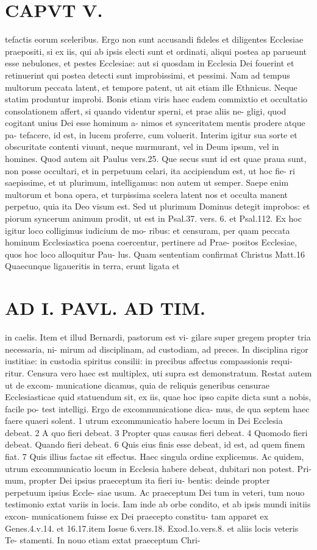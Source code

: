 \documentclass{article}
\begin{document}
\begin{pages}
\section*{CAPVT  V. }
\marginpar{[ p.383 ]}tefactis eorum sceleribus. Ergo non sunt accusandi fideles et diligentes Ecclesiae praepositi, si ex iis, qui ab ipsis electi sunt et ordinati, aliqui postea ap parueunt esse nebulones, et pestes Ecclesiae: aut si quosdam in Ecclesia Dei fouerint et retinuerint qui postea detecti sunt improbissimi, et pessimi. Nam ad tempus multorum peccata latent, et tempore patent, ut ait etiam ille Ethnicus. Neque statim produntur improbi. Bonis etiam viris haec eadem commixtio et occultatio consolationem affert, si quando videntur sperni, et prae aliis ne- gligi, quod cogitant unius Dei esse hominum a- nimos et synceritatem mentis prodere atque pa- tefacere, id est, in lucem proferre, cum voluerit. Interim igitur sua sorte et obscuritate contenti viuunt, neque murmurant, vel in Deum ipsum, vel in homines. Quod autem ait Paulus vers.25. Que secus sunt id est quae praua sunt, non posse occultari, et in perpetuum celari, ita accipiendum est, ut hoc fie- ri saepissime, et ut plurimum, intelligamus: non autem ut semper. Saepe enim multorum et bona opera, et turpissima scelera latent nos et occulta manent perpetuo, quia ita Deo visum est. Sed ut plurimum Dominus detegit improbos: et piorum syncerum animum prodit, ut est in Psal.37. vers. 6. et Psal.112. Ex hoc igitur loco colligimus iudicium de mo- ribus: et censuram, per quam peccata hominum Ecclesiastica poena coercentur, pertinere ad Prae- positos Ecclesiae, quos hoc loco alloquitur Pau- lus. Quam sententiam confirmat Christus Matt.16 Quaecunque ligaueritis in terra, erunt ligata et 
\section*{AD I. PAVL. AD TIM. }
\marginpar{[ p.388 ]}in caelis. Item et illud Bernardi, pastorum est vi- gilare super gregem propter tria necessaria, ni- mirum ad disciplinam, ad custodiam, ad preces. In disciplina rigor iustitiae: in custodia spiritus consilii: in precibus affectus compassionis requi- ritur. Censura vero haec est multiplex, uti supra est demonstratum. Restat autem ut de excom- municatione dicamus, quia de reliquis generibus censurae Ecclesiasticae quid statuendum sit, ex iis, quae hoc ipso capite dicta sunt a nobis, facile po- test intelligi. Ergo de excommunicatione dica- mus, de qua septem haec faere quaeri solent. 1 utrum excommunicatio habere locum in Dei Ecclesia debeat. 2 A quo fieri debeat. 3 Propter quas causas fieri debeat. 4 Quomodo fieri debeat. Quando fieri debeat. 6 Quis eius finis esse debeat, id est, ad quem finem fiat. 7 Quis illius factae sit effectus. Haec singula ordine explicemus. Ac quidem, utrum excommunicatio locum in Ecclesia habere debeat, dubitari non potest. Pri- mum, propter Dei ipsius praeceptum ita fieri iu- bentis: deinde propter perpetuum ipsius Eccle- siae usum. Ac praeceptum Dei tum in veteri, tum nouo testimonio extat variis in locis. Iam inde ab orbe condito, et ab ipsis mundi initiis excon- municationem fuisse ex Dei praecepto constitu- tam apparet ex Genes.4.v.14. et 16.17.item Iosue 6.vers.18. Exod.1o.vers.8. et aliis locis veteris Te- stamenti. In nouo etiam extat praeceptum Chri- 

\end{pages}
\end{document}
